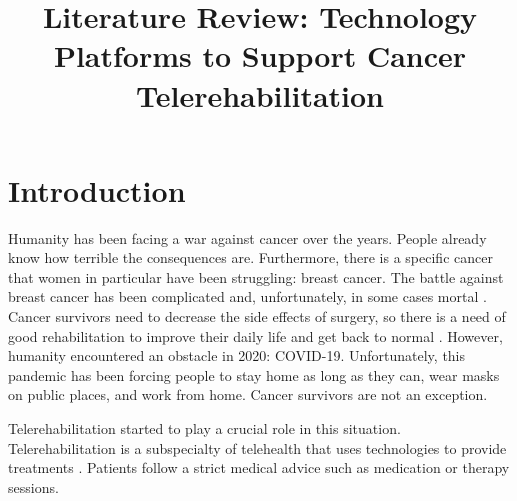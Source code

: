\documentclass[conference]{IEEEtran}
\begin{document}
\title{Literature Review: Technology Platforms to Support Cancer Telerehabilitation}

\author{
}

\maketitle



\section{Introduction}
Humanity has been facing a war against cancer over the years. People already know how terrible the consequences are. Furthermore, there is a specific cancer that women in particular have been struggling: breast cancer. The battle against breast cancer has been complicated and, unfortunately, in some cases mortal \cite{burbank_knowledge_2006}. Cancer survivors need to decrease the side effects of surgery, so there is a need of good rehabilitation to improve their daily life and get back to normal \cite{de_rezende_telerehabilitation_2021}. However, humanity encountered an obstacle in 2020: COVID-19. Unfortunately, this pandemic has been forcing people to stay home as long as they can, wear masks on public places, and work from home. Cancer survivors are not an exception.

Telerehabilitation started to play a crucial role in this situation. Telerehabilitation is a subspecialty of telehealth that uses technologies to provide treatments \cite{galiano-castillo_agreement_2014, van_der_linden_feasibility_2018}. Patients follow a strict medical advice such as medication or therapy sessions.  
\end{document}
